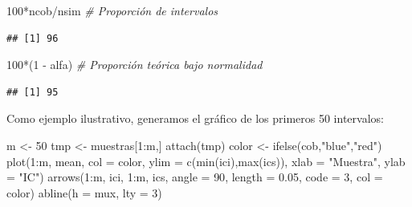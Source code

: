 \documentclass[
]{book}
\newenvironment{Shaded}{\begin{snugshade}}{\end{snugshade}}
\newcommand{\AttributeTok}[1]{\textcolor[rgb]{0.77,0.63,0.00}{#1}}
\newcommand{\CommentTok}[1]{\textcolor[rgb]{0.56,0.35,0.01}{\textit{#1}}}
\newcommand{\DecValTok}[1]{\textcolor[rgb]{0.00,0.00,0.81}{#1}}
\newcommand{\FloatTok}[1]{\textcolor[rgb]{0.00,0.00,0.81}{#1}}
\newcommand{\FunctionTok}[1]{\textcolor[rgb]{0.00,0.00,0.00}{#1}}
\newcommand{\NormalTok}[1]{#1}
\newcommand{\OtherTok}[1]{\textcolor[rgb]{0.56,0.35,0.01}{#1}}
\newcommand{\SpecialCharTok}[1]{\textcolor[rgb]{0.00,0.00,0.00}{#1}}
\newcommand{\StringTok}[1]{\textcolor[rgb]{0.31,0.60,0.02}{#1}}
\theoremstyle{break}
\theoremstyle{definition}
\theoremstyle{definition}
\theoremstyle{definition}
\theoremstyle{definition}
\theoremstyle{remark}
\begin{document}
\begin{enumerate}
\begin{Shaded}
\begin{Highlighting}[]
\DecValTok{100}\SpecialCharTok{*}\NormalTok{ncob}\SpecialCharTok{/}\NormalTok{nsim     }\CommentTok{\# Proporción de intervalos}
\end{Highlighting}
\end{Shaded}

\begin{verbatim}
## [1] 96
\end{verbatim}

\begin{Shaded}
\begin{Highlighting}[]
\DecValTok{100}\SpecialCharTok{*}\NormalTok{(}\DecValTok{1} \SpecialCharTok{{-}}\NormalTok{ alfa)    }\CommentTok{\# Proporción teórica bajo normalidad}
\end{Highlighting}
\end{Shaded}

\begin{verbatim}
## [1] 95
\end{verbatim}

  Como ejemplo ilustrativo, generamos el gráfico de los primeros 50 intervalos:

\begin{Shaded}
\begin{Highlighting}[]
\NormalTok{m }\OtherTok{\textless{}{-}} \DecValTok{50}
\NormalTok{tmp }\OtherTok{\textless{}{-}}\NormalTok{ muestras[}\DecValTok{1}\SpecialCharTok{:}\NormalTok{m,]}
\FunctionTok{attach}\NormalTok{(tmp)}
\NormalTok{color }\OtherTok{\textless{}{-}} \FunctionTok{ifelse}\NormalTok{(cob,}\StringTok{"blue"}\NormalTok{,}\StringTok{"red"}\NormalTok{)}
\FunctionTok{plot}\NormalTok{(}\DecValTok{1}\SpecialCharTok{:}\NormalTok{m, mean, }\AttributeTok{col =}\NormalTok{ color, }\AttributeTok{ylim =} \FunctionTok{c}\NormalTok{(}\FunctionTok{min}\NormalTok{(ici),}\FunctionTok{max}\NormalTok{(ics)), }
     \AttributeTok{xlab =} \StringTok{"Muestra"}\NormalTok{, }\AttributeTok{ylab =} \StringTok{"IC"}\NormalTok{)}
\FunctionTok{arrows}\NormalTok{(}\DecValTok{1}\SpecialCharTok{:}\NormalTok{m, ici, }\DecValTok{1}\SpecialCharTok{:}\NormalTok{m, ics, }\AttributeTok{angle =} \DecValTok{90}\NormalTok{, }\AttributeTok{length =} \FloatTok{0.05}\NormalTok{, }\AttributeTok{code =} \DecValTok{3}\NormalTok{, }\AttributeTok{col =}\NormalTok{ color)}
\FunctionTok{abline}\NormalTok{(}\AttributeTok{h =}\NormalTok{ mux, }\AttributeTok{lty =} \DecValTok{3}\NormalTok{)}
\end{Highlighting}
\end{Shaded}


\end{enumerate}
\end{document}
